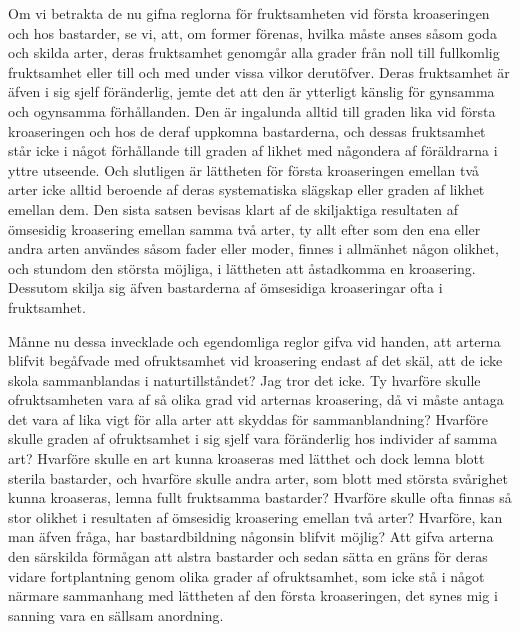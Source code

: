 Om vi betrakta de nu gifna reglorna för fruktsamheten vid första kroaseringen och hos bastarder, se vi, att, om former förenas, hvilka måste anses såsom goda och skilda arter, deras fruktsamhet genomgår alla grader från noll till fullkomlig fruktsamhet eller till och med under vissa vilkor derutöfver. Deras fruktsamhet är äfven i sig sjelf föränderlig, jemte det att den är ytterligt känslig för gynsamma och ogynsamma förhållanden. Den är ingalunda alltid till graden lika vid första kroaseringen och hos de deraf uppkomna bastarderna, och dessas fruktsamhet står icke i något förhållande till graden af likhet med någondera af föräldrarna i yttre utseende. Och slutligen är lättheten för första kroaseringen emellan två arter icke alltid beroende af deras systematiska slägskap eller graden af likhet emellan dem. Den sista satsen bevisas klart af de skiljaktiga resultaten af ömsesidig kroasering emellan samma två arter, ty allt efter som den ena eller andra arten användes såsom fader eller moder, finnes i allmänhet någon olikhet, och stundom den största möjliga, i lättheten att åstadkomma en kroasering. Dessutom skilja sig äfven bastarderna af ömsesidiga kroaseringar ofta i fruktsamhet.

Månne nu dessa invecklade och egendomliga reglor gifva vid handen, att arterna blifvit begåfvade med ofruktsamhet vid kroasering endast af det skäl, att de icke skola sammanblandas i naturtillståndet? Jag tror det icke. Ty hvarföre skulle ofruktsamheten vara af så olika grad vid arternas kroasering, då vi måste antaga det vara af lika vigt för alla arter att skyddas för sammanblandning? Hvarföre skulle graden af ofruktsamhet i sig sjelf vara föränderlig hos individer af samma art? Hvarföre skulle en art kunna kroaseras med lätthet och dock lemna blott sterila bastarder, och hvarföre skulle andra arter, som blott med största svårighet kunna kroaseras, lemna fullt fruktsamma bastarder? Hvarföre skulle ofta finnas så stor olikhet i resultaten af ömsesidig kroasering emellan två arter? Hvarföre, kan man äfven fråga, har bastardbildning någonsin blifvit möjlig? Att gifva arterna den särskilda förmågan att alstra bastarder och sedan sätta en gräns för deras vidare fortplantning genom olika grader af ofruktsamhet, som icke stå i något närmare sammanhang med lättheten af den första kroaseringen, det synes mig i sanning vara en sällsam anordning.

